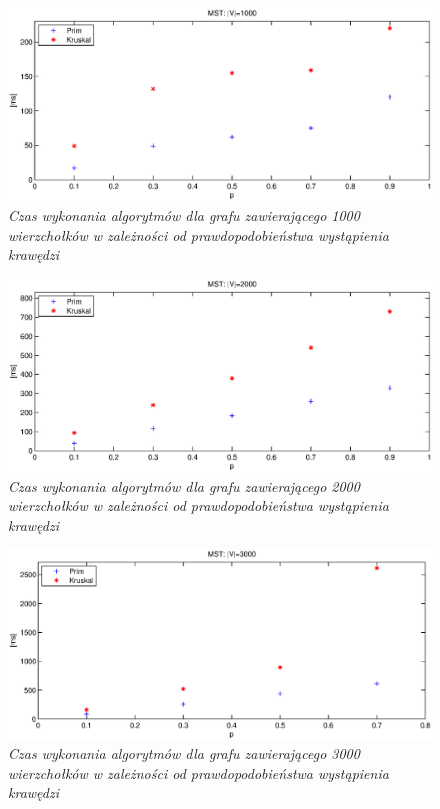 \documentclass[a4paper, 10pt]{article}
\begin{document}
\begin{figure}[ht!]
\centering
\includegraphics[width=165mm]{wykresy/v1000.eps}
\caption{\it{Czas wykonania algorytmów dla grafu zawierającego 1000 wierzchołków w zależności od prawdopodobieństwa wystąpienia krawędzi}}
\label{overflow}
\end{figure}

\begin{figure}[ht!]
\centering
\includegraphics[width=165mm]{wykresy/v2000.eps}
\caption{\it{Czas wykonania algorytmów dla grafu zawierającego 2000 wierzchołków w zależności od prawdopodobieństwa wystąpienia krawędzi}}
\label{overflow}
\end{figure}

\begin{figure}[ht!]
\centering
\includegraphics[width=165mm]{wykresy/v3000.eps}
\caption{\it{Czas wykonania algorytmów dla grafu zawierającego 3000 wierzchołków w zależności od prawdopodobieństwa wystąpienia krawędzi}}
\label{overflow}
\end{figure}
\end{document}
